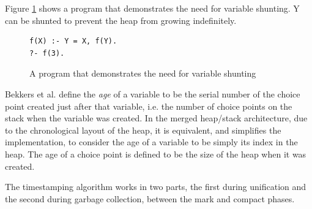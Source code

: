 Figure \ref{fig:shunt-program} shows a program that demonstrates the need for variable shunting. Y can be shunted to prevent the heap from growing indefinitely.

\begin{figure}[H]
\centering
\begin{verbatim}
f(X) :- Y = X, f(Y).
?- f(3).
\end{verbatim}
\caption{A program that demonstrates the need for variable shunting}
\label{fig:shunt-program}
\end{figure}

Bekkers et al. define the \emph{age} of a variable to be the serial number of the choice point created just after that variable, i.e. the number of choice points on the stack when the variable was created. In the merged heap/stack architecture, due to the chronological layout of the heap, it is equivalent, and simplifies the implementation, to consider the age of a variable to be simply its index in the heap. The age of a choice point is defined to be the size of the heap when it was created.

The timestamping algorithm works in two parts, the first during unification and the second during garbage collection, between the mark and compact phases.

